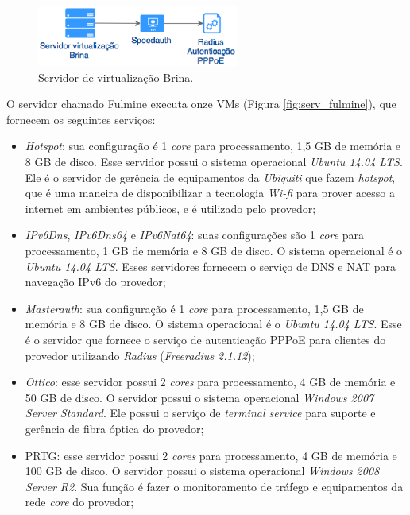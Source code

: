 \begin{figure}[h!]
 \centering
 \includegraphics[width=250px]{img/serv_brina.eps}
 \caption{Servidor de virtualização Brina.}
 \label{fig:serv_brina}
\end{figure}

O servidor chamado Fulmine executa onze \ac{VM}s (Figura \ref{fig:serv_fulmine}), que fornecem os seguintes serviços:
\begin{itemize}
 \item \textit{Hotspot}: sua configuração é 1 \textit{core} para processamento, 1,5 GB de memória e 8 GB de disco. Esse servidor possui o 
 sistema operacional \textit{Ubuntu 14.04 \ac{LTS}}. Ele é o servidor de gerência de equipamentos da \textit{Ubiquiti} que fazem \textit{hotspot}, 
 que é uma maneira de disponibilizar a tecnologia \textit{Wi-fi} para prover acesso a internet em ambientes públicos, e é utilizado pelo provedor;
 
 \item \textit{IPv6Dns}, \textit{IPv6Dns64} e \textit{IPv6Nat64}: suas configurações são 1 \textit{core} para processamento, 1 GB de memória e 
 8 GB de disco. O sistema operacional é o \textit{Ubuntu 14.04 \ac{LTS}}. Esses servidores fornecem o serviço de \ac{DNS} e \ac{NAT} para 
 navegação \ac{IPv6} do provedor;
 
 \item \textit{Masterauth}: sua configuração é 1 \textit{core} para processamento, 1,5 GB de memória e 8 GB de disco. O sistema operacional é o 
 \textit{Ubuntu 14.04 \ac{LTS}}. Esse é o servidor que fornece o serviço de autenticação \ac{PPPoE} para clientes do provedor utilizando 
 \textit{Radius} (\textit{Freeradius 2.1.12});
 
 \item \textit{Ottico}: esse servidor possui 2 \textit{cores} para processamento, 4 GB de memória e 50 GB de disco. O servidor possui o sistema 
 operacional \textit{Windows 2007 Server Standard}. Ele possui o serviço de \textit{terminal service} para suporte e gerência de fibra óptica do 
 provedor;
 
 \item \ac{PRTG}: esse servidor possui 2 \textit{cores} para processamento, 4 GB de memória e 100 GB de disco. O servidor possui o sistema 
 operacional \textit{Windows 2008 Server R2}. Sua função é fazer o monitoramento de tráfego e equipamentos da rede \textit{core} do provedor;
 

\end{itemize}

